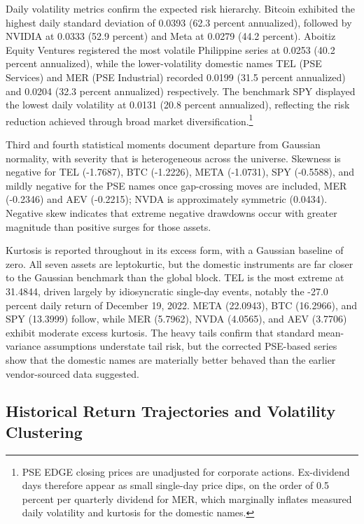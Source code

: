Daily volatility metrics confirm the expected risk hierarchy. Bitcoin exhibited the highest daily standard deviation of 0.0393 (62.3 percent annualized), followed by NVIDIA at 0.0333 (52.9 percent) and Meta at 0.0279 (44.2 percent). Aboitiz Equity Ventures registered the most volatile Philippine series at 0.0253 (40.2 percent annualized), while the lower-volatility domestic names TEL (PSE Services) and MER (PSE Industrial) recorded 0.0199 (31.5 percent annualized) and 0.0204 (32.3 percent annualized) respectively. The benchmark SPY displayed the lowest daily volatility at 0.0131 (20.8 percent annualized), reflecting the risk reduction achieved through broad market diversification.\footnote{PSE EDGE closing prices are unadjusted for corporate actions. Ex-dividend days therefore appear as small single-day price dips, on the order of 0.5 percent per quarterly dividend for MER, which marginally inflates measured daily volatility and kurtosis for the domestic names.}

Third and fourth statistical moments document departure from Gaussian normality, with severity that is heterogeneous across the universe. Skewness is negative for TEL (-1.7687), BTC (-1.2226), META (-1.0731), SPY (-0.5588), and mildly negative for the PSE names once gap-crossing moves are included, MER (-0.2346) and AEV (-0.2215); NVDA is approximately symmetric (0.0434). Negative skew indicates that extreme negative drawdowns occur with greater magnitude than positive surges for those assets.

Kurtosis is reported throughout in its excess form, with a Gaussian baseline of zero. All seven assets are leptokurtic, but the domestic instruments are far closer to the Gaussian benchmark than the global block. TEL is the most extreme at 31.4844, driven largely by idiosyncratic single-day events, notably the -27.0 percent daily return of December 19, 2022. META (22.0943), BTC (16.2966), and SPY (13.3999) follow, while MER (5.7962), NVDA (4.0565), and AEV (3.7706) exhibit moderate excess kurtosis. The heavy tails confirm that standard mean-variance assumptions understate tail risk, but the corrected PSE-based series show that the domestic names are materially better behaved than the earlier vendor-sourced data suggested.

\subsection{Historical Return Trajectories and Volatility Clustering}

